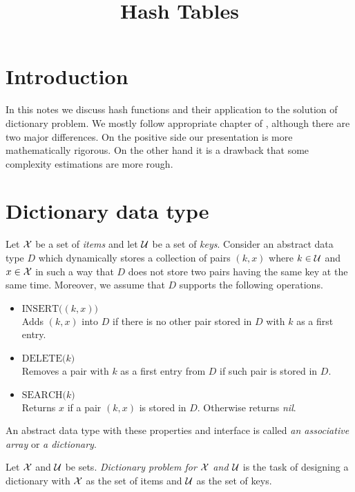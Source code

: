 


\title{Hash Tables}
\date{}
\maketitle

\section{Introduction}
\noindent
In this notes we discuss hash functions and their application to the solution of dictionary problem. We mostly follow appropriate chapter of \cite{CormenLeisersonRivestStein}, although there are two major differences. On the positive side our presentation is more mathematically rigorous. On the other hand it is a drawback that some complexity estimations are more rough.

\section{Dictionary data type}

\begin{definition}
Let ${\mathcal X}$ be a set of \textit{items} and let ${\mathcal U}$ be a set of \textit{keys}. Consider an abstract data type $D$ which dynamically stores a collection of pairs $(k, x)$ where $k\in {\mathcal U}$ and $x\in {\mathcal X}$ in such a way that $D$ does not store two pairs having the same key at the same time. Moreover, we assume that $D$ supports the following operations.
\begin{itemize}
\item[] $\textrm{INSERT}\big((k,x)\big)$\\
Adds $(k,x)$ into $D$ if there is no other pair stored in $D$ with $k$ as a first entry.
\item[] $\textrm{DELETE}\big(k\big)$\\
Removes a pair with $k$ as a first entry from $D$ if such pair is stored in $D$.
\item[] $\textrm{SEARCH}\big(k\big)$\\
Returns $x$ if a pair $(k,x)$ is stored in $D$. Otherwise returns \textit{nil}. 
\end{itemize}
An abstract data type with these properties and interface is called \textit{an associative array} or \textit{a dictionary}.
\end{definition}

\begin{definition}
Let ${\mathcal X}$ and ${\mathcal U}$ be sets. \textit{Dictionary problem for ${\mathcal X}$ and ${\mathcal U}$} is the task of designing a dictionary with ${\mathcal X}$ as the set of items and ${\mathcal U}$ as the set of keys.
\end{definition}

